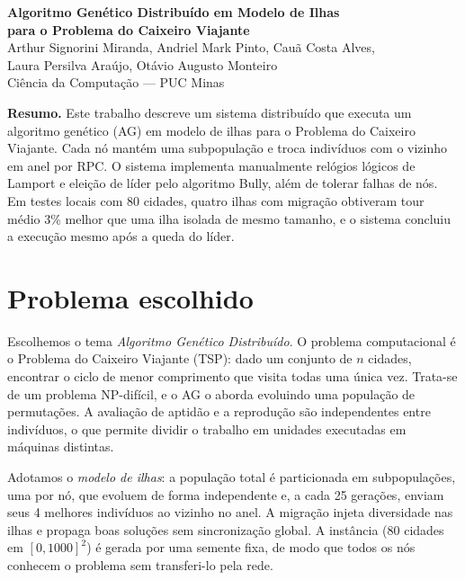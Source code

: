 \documentclass[12pt]{article}
\begin{document}
\begin{center}
{\Large\bfseries Algoritmo Genético Distribuído em Modelo de Ilhas\\[2pt] para o Problema do Caixeiro Viajante}\\[8pt]
{\normalsize Arthur Signorini Miranda, Andriel Mark Pinto, Cauã Costa Alves,\\{} Laura Persilva Araújo, Otávio Augusto Monteiro}\\[3pt]
{\small Ciência da Computação --- PUC Minas\\}
\end{center}

\begin{center}
\begin{minipage}{0.92\textwidth}
\small\noindent\textbf{Resumo.} Este trabalho descreve um sistema distribuído que executa um algoritmo genético (AG) em modelo de ilhas para o Problema do Caixeiro Viajante. Cada nó mantém uma subpopulação e troca indivíduos com o vizinho em anel por RPC. O sistema implementa manualmente relógios lógicos de Lamport e eleição de líder pelo algoritmo Bully, além de tolerar falhas de nós. Em testes locais com 80 cidades, quatro ilhas com migração obtiveram tour médio 3\% melhor que uma ilha isolada de mesmo tamanho, e o sistema concluiu a execução mesmo após a queda do líder.
\end{minipage}
\end{center}

\section{Problema escolhido}
Escolhemos o tema \textit{Algoritmo Genético Distribuído}. O problema computacional é o Problema do Caixeiro Viajante (TSP): dado um conjunto de $n$ cidades, encontrar o ciclo de menor comprimento que visita todas uma única vez. Trata-se de um problema NP-difícil, e o AG o aborda evoluindo uma população de permutações. A avaliação de aptidão e a reprodução são independentes entre indivíduos, o que permite dividir o trabalho em unidades executadas em máquinas distintas.

Adotamos o \textit{modelo de ilhas}: a população total é particionada em subpopulações, uma por nó, que evoluem de forma independente e, a cada 25 gerações, enviam seus 4 melhores indivíduos ao vizinho no anel. A migração injeta diversidade nas ilhas e propaga boas soluções sem sincronização global. A instância (80 cidades em $[0,1000]^2$) é gerada por uma semente fixa, de modo que todos os nós conhecem o problema sem transferi-lo pela rede.
\end{document}
